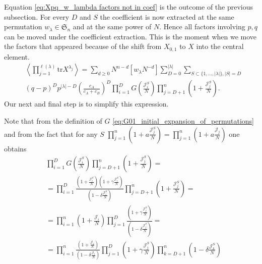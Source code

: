 \documentclass{article}
\newcommand{\tr}{\mathrm{tr}}
\theoremstyle{plain}
\theoremstyle{definition}
\numberwithin{equation}{section}
\begin{document}
Equation \eqref{eq:Xpq_w_lambda factors not in coef} is the outcome of the
previous subsection. For every $D$ and $S$ the coefficient is now extracted at
the same permutation $w_\lambda\in\mathfrak{S}_n$ and at the same power of $N$.
Hence all factors involving $p,q$ can be moved under the coefficient
extraction. This is the moment when we move the factors that appeared because
of the shift from $X_{0,1}$ to $X$ into the central element.
\begin{equation}
    \label{eq:Xpq_w_lambda}
    \begin{aligned}
        & \left\langle \prod_{j=1}^{\ell(\lambda)} \tr X^{\lambda_{j}} \right\rangle = \sum\limits_{d\ge 0}  N^{n- d} [w_\lambda N^{-d}] \sum_{D=0}^{|\lambda|}\sum_{S\subset \{1,\dots,|\lambda|\}, |S| = D} \\
        & (q-p)^{D} p^{|\lambda|-D} \left(\frac{c_{A}}{c_{A}+c_{B}}\right)^{D} \prod_{i=1}^{D} G\left(\frac{\mathcal{J}_{i}^S}{N} \right) \prod_{j=D+1}^n \left(1+\frac{\mathcal{J}_{j}^S}{N}\right).
    \end{aligned}
\end{equation}
Our next and final step is to simplify this expression.

Note that from the definition of $G$ \eqref{eq:G01_initial_expansion_of_permutations} and from the fact that for any $S$ $\prod_{j=1}^n\left(1+a\frac{\mathcal{J}_{j}^S}{N}\right) = \prod_{j=1}^n\left(1+a \frac{\mathcal{J}_{j}}{N}\right)$ one obtains
\begin{equation}
    \begin{aligned}
        & \prod_{i=1}^D G\left(\frac{\mathcal{J}_{i}^S}{N} \right) \prod_{j=D+1}^n \left(1+\frac{\mathcal{J}_{j}^S}{N}\right) = \\
        & = \prod_{i=1}^D \frac{\left(1+\frac{\mathcal{J}_{i}^S}{N} \right)\left(1+\gamma\frac{\mathcal{J}_{i}^S}{N}\right)}{\left(1- \delta\frac{\mathcal{J}_{i}^S} {N} \right)} \prod_{j=D+1}^n\left(1+\frac{\mathcal{J}_{j}^S}{N}\right) = \\
        & = \prod_{i=1}^n \left(1+\frac{\mathcal{J}_i}{N}\right) \prod_{j=1}^D \frac{\left(1+\gamma\frac{\mathcal{J}_j^S}{N}\right) }{\left(1- \delta\frac{\mathcal{J}_j^S}{N}\right)}=\\
        & = \prod_{i=1}^n \frac{\left(1+\frac{\mathcal{J}_i}{N}\right)}{\left(1- \delta \frac{\mathcal{J}_i}{N}\right)} \prod_{j=1}^D \left(1+\gamma\frac{\mathcal{J}_j^S}{N}\right) \prod_{k=D+1}^n \left(1- \delta\frac{\mathcal{J}_k^S}{N}\right)
    \end{aligned}
\end{equation}
\end{document}
